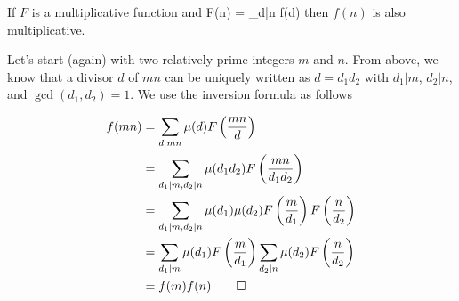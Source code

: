 \begin{theorem}
    If $F$ is a multiplicative function and 
    \bee
    F(n) = \sum_{d|n} f(d)
    \eee
    then $f(n)$ is also multiplicative.
\end{theorem}

Let's start (again) with two relatively prime integers $m$ and $n$. From above, we know that a divisor $d$ of $mn$ can be uniquely written as $d = d_1 d_2$ with $d_1 | m$, $d_2 | n$, and $\gcd(d_1, d_2) = 1$. We use the inversion formula as follows

\begin{align*}
    f(mn) &= \sum_{d|mn} \mu(d) F\left(\frac{mn}{d}\right) \\
    &= \sum_{d_1|m, d_2|n} \mu(d_1 d_2) F\left(\frac{mn}{d_1 d_2}\right) \\
    &= \sum_{d_1|m, d_2|n} \mu(d_1) \mu(d_2) F\left(\frac{m}{d_1}\right) F\left(\frac{n}{d_2}\right) \\
    &= \sum_{d_1|m} \mu(d_1) F\left(\frac{m}{d_1}\right) \sum_{d_2|n} \mu(d_2)  F\left(\frac{n}{d_2} \right) \\
    &= f(m) f(n) \qed
\end{align*}


